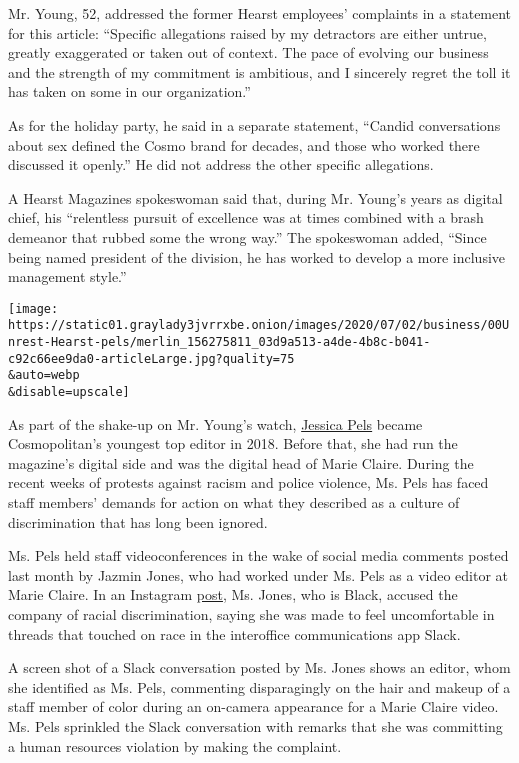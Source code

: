 Mr. Young, 52, addressed the former Hearst employees' complaints in a
statement for this article: ``Specific allegations raised by my
detractors are either untrue, greatly exaggerated or taken out of
context. The pace of evolving our business and the strength of my
commitment is ambitious, and I sincerely regret the toll it has taken on
some in our organization.''

As for the holiday party, he said in a separate statement, ``Candid
conversations about sex defined the Cosmo brand for decades, and those
who worked there discussed it openly.'' He did not address the other
specific allegations.

A Hearst Magazines spokeswoman said that, during Mr. Young's years as
digital chief, his ``relentless pursuit of excellence was at times
combined with a brash demeanor that rubbed some the wrong way.'' The
spokeswoman added, ``Since being named president of the division, he has
worked to develop a more inclusive management style.''

\texttt{[image: https://static01.graylady3jvrrxbe.onion/images/2020/07/02/business/00Unrest-Hearst-pels/merlin\_156275811\_03d9a513-a4de-4b8c-b041-c92c66ee9da0-articleLarge.jpg?quality=75\\\&auto=webp\\\&disable=upscale]}

As part of the shake-up on Mr. Young's watch,
\href{https://www.nytimes3xbfgragh.onion/2019/04/05/style/cosmopolitan-magazine-jessica-pels.html}{Jessica
Pels} became Cosmopolitan's youngest top editor in 2018. Before that,
she had run the magazine's digital side and was the digital head of
Marie Claire. During the recent weeks of protests against racism and
police violence, Ms. Pels has faced staff members' demands for action on
what they described as a culture of discrimination that has long been
ignored.

Ms. Pels held staff videoconferences in the wake of social media
comments posted last month by Jazmin Jones, who had worked under Ms.
Pels as a video editor at Marie Claire. In an Instagram
\href{https://www.instagram.com/p/CBGjWu1jXQC/?utm_source=ig_web_copy_link}{post},
Ms. Jones, who is Black, accused the company of racial discrimination,
saying she was made to feel uncomfortable in threads that touched on
race in the interoffice communications app Slack.

A screen shot of a Slack conversation posted by Ms. Jones shows an
editor, whom she identified as Ms. Pels, commenting disparagingly on the
hair and makeup of a staff member of color during an on-camera
appearance for a Marie Claire video. Ms. Pels sprinkled the Slack
conversation with remarks that she was committing a human resources
violation by making the complaint.

